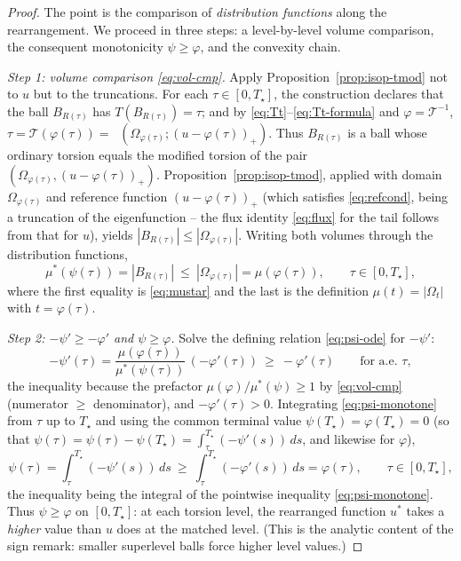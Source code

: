 \documentclass[11pt]{amsart}
\theoremstyle{definition}
\newcommand{\Om}{\Omega}
\newcommand{\abs}[1]{\left|#1\right|}
\DeclareMathOperator{\Tmod}{T_{\mathrm{mod}}}
\begin{document}
\begin{proof}
The point is the comparison of \emph{distribution functions} along the
rearrangement. We proceed in three steps: a level-by-level volume
comparison, the consequent monotonicity $\psi\ge\varphi$, and the convexity
chain.

\emph{Step 1: volume comparison \eqref{eq:vol-cmp}.} Apply
Proposition~\ref{prop:isop-tmod} not to $u$ but to the truncations. For each
$\tau\in[0,T_\star]$, the construction declares that the ball $B_{R(\tau)}$
has $T(B_{R(\tau)})=\tau$; and by \eqref{eq:Tt}--\eqref{eq:Tt-formula} and
$\varphi=\mathcal T^{-1}$,
$\tau=\mathcal T(\varphi(\tau))=\Tmod(\Om_{\varphi(\tau)};
(u-\varphi(\tau))_+)$. Thus $B_{R(\tau)}$ is a ball whose ordinary torsion
equals the modified torsion of the pair $(\Om_{\varphi(\tau)},
(u-\varphi(\tau))_+)$. Proposition~\ref{prop:isop-tmod}, applied with domain
$\Om_{\varphi(\tau)}$ and reference function $(u-\varphi(\tau))_+$ (which
satisfies \eqref{eq:refcond}, being a truncation of the eigenfunction --
the flux identity \eqref{eq:flux} for the tail follows from that for $u$),
yields $\abs{B_{R(\tau)}}\le\abs{\Om_{\varphi(\tau)}}$. Writing both volumes
through the distribution functions,
\begin{equation}\label{eq:vol-cmp}
  \mu^*(\psi(\tau))=\abs{B_{R(\tau)}}\ \le\ \abs{\Om_{\varphi(\tau)}}
  =\mu(\varphi(\tau)),\qquad\tau\in[0,T_\star],
\end{equation}
where the first equality is \eqref{eq:mustar} and the last is the definition
$\mu(t)=\abs{\Om_t}$ with $t=\varphi(\tau)$.

\emph{Step 2: $-\psi'\ge-\varphi'$ and $\psi\ge\varphi$.} Solve the defining
relation \eqref{eq:psi-ode} for $-\psi'$:
\begin{equation}\label{eq:psi-monotone}
  -\psi'(\tau)=\frac{\mu(\varphi(\tau))}{\mu^*(\psi(\tau))}\,(-\varphi'(\tau))
  \ \ge\ -\varphi'(\tau)\qquad\text{for a.e.\ }\tau,
\end{equation}
the inequality because the prefactor $\mu(\varphi)/\mu^*(\psi)\ge1$ by
\eqref{eq:vol-cmp} (numerator $\ge$ denominator), and $-\varphi'(\tau)>0$.
Integrating \eqref{eq:psi-monotone} from $\tau$ up to $T_\star$ and using the
common terminal value $\psi(T_\star)=\varphi(T_\star)=0$ (so that
$\psi(\tau)=\psi(\tau)-\psi(T_\star)=\int_\tau^{T_\star}(-\psi'(s))\,ds$, and
likewise for $\varphi$),
\begin{equation}\label{eq:psi-ge-phi}
  \psi(\tau)=\int_\tau^{T_\star}(-\psi'(s))\,ds
  \ \ge\ \int_\tau^{T_\star}(-\varphi'(s))\,ds=\varphi(\tau),
  \qquad\tau\in[0,T_\star],
\end{equation}
the inequality being the integral of the pointwise inequality
\eqref{eq:psi-monotone}. Thus $\psi\ge\varphi$ on $[0,T_\star]$: at each
torsion level, the rearranged function $u^*$ takes a \emph{higher} value than
$u$ does at the matched level. (This is the analytic content of the sign
remark: smaller superlevel balls force higher level values.)


\end{proof}
\end{document}
